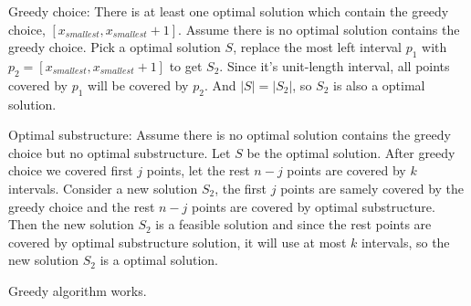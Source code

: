 \documentclass[paper=a4, fontsize=11pt]{scrartcl} %
\begin{document}
Greedy choice:
There is at least one optimal solution which contain the greedy
choice, $[x_{smallest},x_{smallest}+1]$. Assume there is no optimal
solution contains the greedy choice. Pick a optimal solution $S$,
replace the most left interval $p_1$ with $p_2 =
[x_{smallest},x_{smallest}+1]$ to get $S_2$. Since it's unit-length
interval, all points covered by $p_1$ will be covered by $p_2$. And
$|S|=|S_2|$, so $S_2$ is also a optimal solution.

Optimal substructure:
Assume there is no optimal solution contains the greedy choice but no
optimal substructure. Let $S$ be the optimal solution. After greedy
choice we covered first $j$ points, let the rest $n-j$ points are
covered by $k$ intervals. Consider a new solution $S_2$, the first $j$
points are samely covered by the greedy choice and the rest $n-j$
points are covered by optimal substructure. Then the new solution
$S_2$ is a feasible solution and since the rest points are covered by
optimal substructure solution, it will use at most $k$ intervals, so
the new solution $S_2$ is a optimal solution.

Greedy algorithm works.

\pagebreak
\end{document}
